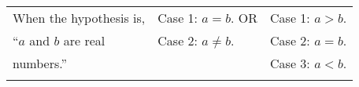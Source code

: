 \noindent
\begin{tabular}{ l l l }
When the hypothesis is,          & Case 1: $a = b$. \quad  OR  &   Case 1: $a > b$. \\
``$a$ and $b$ are real           & Case 2: $a \ne b$.        &  Case 2: $a = b$. \\
      numbers.''                 &                          &  Case 3: $a < b$. \\
  &  &  \\
\end{tabular}

\hbreak


\endinput


\endinput
